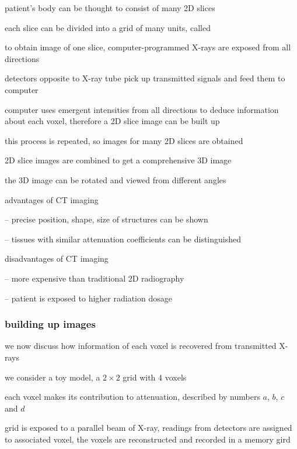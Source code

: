 patient's body can be thought to consist of many 2D slices

each slice can be divided into a grid of many units, called 

to obtain image of one slice, computer-programmed X-rays are exposed from all directions

detectors opposite to X-ray tube pick up transmitted signals and feed them to computer

computer uses emergent intensities from all directions to deduce information about each voxel, therefore a 2D slice image can be built up

this process is repeated, so images for many 2D slices are obtained

2D slice images are combined to get a comprehensive 3D image

the 3D image can be rotated and viewed from different angles

\cmt advantages of CT imaging

\begin{compactitem}
	\item[--] precise position, shape, size of structures can be shown
	
	\item[--] tissues with similar attenuation coefficients can be distinguished

\end{compactitem}

\cmt disadvantages of CT imaging

\begin{compactitem}
	\item[--] more expensive than traditional 2D radiography
	
	\item[--] patient is exposed to higher radiation dosage
\end{compactitem}

\subsubsection*{building up images}

we now discuss how information of each voxel is recovered from transmitted X-rays

we consider a toy model, a $2\times2$ grid with 4 voxels

each voxel makes its contribution to attenuation, described by numbers $a$, $b$, $c$ and $d$

grid is exposed to a parallel beam of X-ray, readings from detectors are assigned to associated voxel, the voxels are reconstructed and recorded in a memory gird

